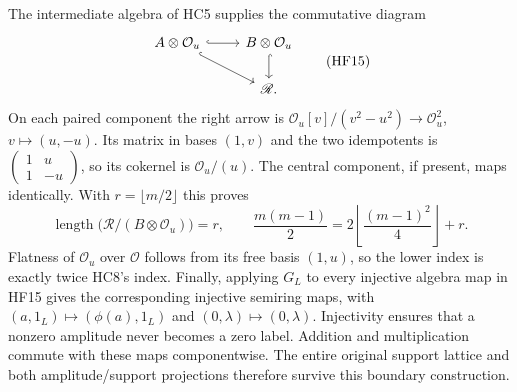 The intermediate algebra of HC5 supplies the commutative diagram
\[
 \begin{tikzcd}
 A\otimes\mathcal O_u\arrow[r,hook]\arrow[dr,hook]&
 B\otimes\mathcal O_u\arrow[d,hook]\\
 &\mathscr R.
 \end{tikzcd}
 \tag{HF15}
\]
On each paired component the right arrow is
$\mathcal O_u[v]/(v^2-u^2)\to\mathcal O_u^2$,
$v\mapsto(u,-u)$. Its matrix in bases $(1,v)$ and the two
idempotents is $\left(\begin{smallmatrix}1&u\\1&-u\end{smallmatrix}\right)$,
so its cokernel is $\mathcal O_u/(u)$. The central component,
if present, maps identically. With $r=\lfloor m/2\rfloor$ this proves
\[
 \operatorname{length}\bigl(\mathscr R/(B\otimes\mathcal O_u)\bigr)=r,
 \qquad \frac{m(m-1)}2
     =2\left\lfloor\frac{(m-1)^2}{4}\right\rfloor+r.
 \tag{HF16}
\]
Flatness of $\mathcal O_u$ over $\mathcal O$ follows from its free
basis $(1,u)$, so the lower index is exactly twice HC8's index.
Finally, applying $G_L$ to every injective algebra map in HF15
gives the corresponding injective semiring maps, with
$(a,1_L)\mapsto(\phi(a),1_L)$ and $(0,\lambda)\mapsto(0,\lambda)$.
Injectivity ensures that a nonzero amplitude never becomes a zero
label. Addition and multiplication commute with these maps
componentwise. The entire original support lattice and both
amplitude/support projections therefore survive this boundary
construction.

